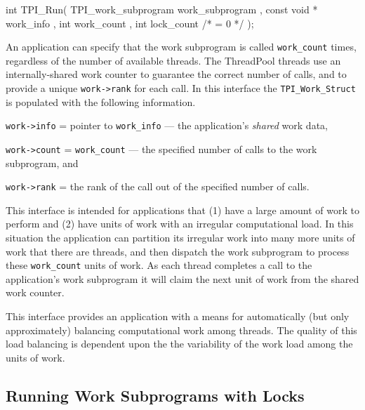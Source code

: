 \begin{center}
\small
\begin{boxedverbatim}
int TPI_Run( TPI_work_subprogram work_subprogram  ,
             const void *        work_info ,
             int                 work_count  ,
             int                 lock_count /* = 0 */ );
\end{boxedverbatim}
\end{center}

An application can specify that the work subprogram is called \texttt{work\_count} times, regardless of the number of available threads.
%
The ThreadPool threads use an internally-shared work counter to guarantee the correct number of calls, and to provide a unique \texttt{work->rank} for each call.
%
In this interface the \texttt{TPI\_Work\_Struct} is populated with the following information.
%
\begin{blist}
\item \texttt{work->info} = pointer to \texttt{work\_info} --- the application's \emph{shared} work data,
\item \texttt{work->count} = \texttt{work\_count} --- the specified number of calls to the work subprogram, and
\item \texttt{work->rank} = the rank of the call out of the specified number of calls.
\end{blist}



This interface is intended for applications that
(1) have a large amount of work to perform and
(2) have units of work with an irregular computational load.
%
In this situation the application can partition its irregular work into many more units of work that there are threads, and then dispatch the work subprogram to process these \texttt{work\_count} units of work.
%
As each thread completes a call to the application's work subprogram it will claim the next unit of work from the shared work counter.


This interface provides an application with a means for automatically (but only approximately) balancing computational work among threads.
%
The quality of this load balancing is dependent upon the the variability of the work load among the units of work.


\subsection{Running Work Subprograms with Locks} \label{sec:RunWorkLock}

